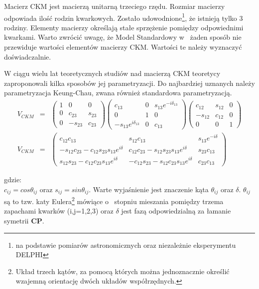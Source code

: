 Macierz CKM jest macierzą unitarną trzeciego rzędu. Rozmiar macierzy odpowiada ilość rodzin kwarkowych. Zostało udowodnione\footnote{na podstawie pomiarów astronomicznych oraz niezależnie eksperymentu DELPHI}, że istnieją tylko 3 rodziny. Elementy macierzy określają stałe sprzężenie pomiędzy odpowiednimi kwarkami. Warto zwrócić uwagę, że Model Standardowy w~ żaden sposób nie przewiduje wartości elementów macierzy CKM. Wartości te należy wyznaczyć doświadczalnie. 

W ciągu wielu lat teoretycznych studiów nad macierzą CKM teoretycy zaproponowali kilka sposobów jej parametryzacji. Do najbardziej uznanych należy parametryzacja Keung-Chau, zwana również standardowa parametryzacją. 
\begin{eqnarray}
V_{CKM}&=&\begin{pmatrix} 1 & 0 & 0 \\ 0 & c_{23} & s_{23} \\ 0 & -s_{23} & c_{23} \end{pmatrix}
 \begin{pmatrix} c_{13} & 0 & s_{13}e^{-i\delta_{13}} \\ 0 & 1 & 0 \\ -s_{13}e^{i\delta_{13}} & 0 & c_{13} \end{pmatrix}
 \begin{pmatrix} c_{12} & s_{12} & 0 \\ -s_{12} & c_{12} & 0 \\ 0 & 0 & 1 \end{pmatrix} \nonumber \\
V_{CKM}&=&\begin{pmatrix}
c_{12}c_{13}&s_{12}c_{13}& s_{13}e^{-i\delta} \\
 -s_{12}c_{23}-c_{12}s_{23}s_{13}e^{i\delta} & c_{12}c_{23}-s_{12}s_{23}s_{13}e^{i\delta}  & s_{23}c_{13}\\ s_{12}s_{23}-c_{12}c_{23}s_{13}e^{i\delta} & -c_{12}s_{23}-s_{12}c_{23}s_{13}e^{i\delta} & c_{23}c_{13}
\end{pmatrix}
\end{eqnarray}

gdzie:\\
$c_{ij}=cos\theta_{ij}$ oraz $s_{ij}=sin\theta_{ij}$. Warte wyjaśnienie jest znaczenie kąta $\theta_{ij}$ oraz $\delta$. $\theta_{ij}$ są to tzw. katy Eulera\footnote{Układ trzech kątów, za pomocą których można jednoznacznie określić wzajemną orientację dwóch układów współrzędnych.} mówiące o~ stopniu mieszania pomiędzy trzema zapachami kwarków (i,j=1,2,3) oraz $\delta$ jest fazą odpowiedzialną za łamanie symetrii \textbf{CP}.

